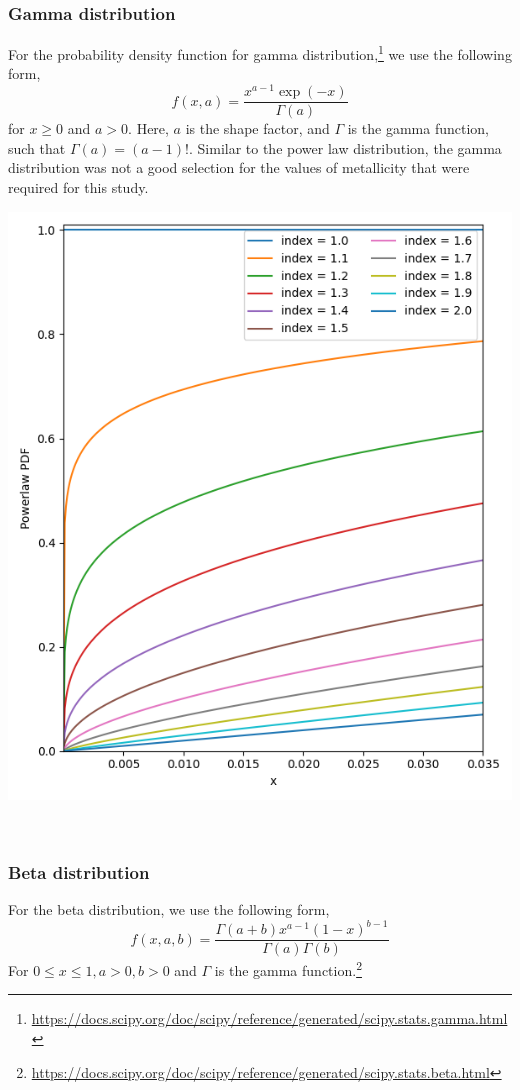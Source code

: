 \subsubsection*{\textbf{Gamma distribution}}
For the probability density function for gamma distribution,\footnote{\url{https://docs.scipy.org/doc/scipy/reference/generated/scipy.stats.gamma.html}} we use the following form,
\begin{equation}
    f(x, a) = \frac{x^{a-1}\exp(-x)}{\Gamma(a)}
    \label{eq:gamma_distribution}
\end{equation}
for $x\geq 0$ and $a > 0$.
Here, $a$ is the shape factor, and $\Gamma$ is the gamma function, such that $\Gamma(a) = (a-1)!$.
Similar to the power law distribution, the gamma distribution was not a good selection for the values of metallicity that were required for this study.
\begin{minipage}[r]{0.48\textwidth}
    \centering
    \includegraphics[width=\textwidth]{images/powerlaw}
\end{minipage}

\,\\\subsubsection*{\textbf{Beta distribution}}
For the beta distribution, we use the following form,
\begin{equation}
    f(x, a, b) = \frac{\Gamma(a+b)x^{a-1}(1-x)^{b-1}}{\Gamma(a)\Gamma(b)}
    \label{eq:beta_distribution}
\end{equation}
For $0 \leq x \leq 1, a > 0, b > 0$ and $\Gamma$ is the gamma function.\footnote{\url{https://docs.scipy.org/doc/scipy/reference/generated/scipy.stats.beta.html}}

